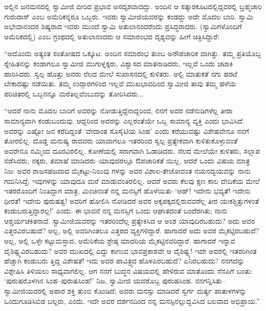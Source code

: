 ಅಲ್ಲಿನ ಜನಮನದಲ್ಲಿ ಸ್ವಾಮೀಜಿ ಬೀರಿದ ಪ್ರಭಾವ ಅಸದೃಶವಾದದ್ದು. ಅಂದಿನ ಆ ಸತ್ಕಾರಕೂಟದಲ್ಲಿದ್ದವರಲ್ಲಿ ಬ್ರಹ್ಮಚಾರಿ ಗುರುದಾಸ್ ಎಂಬ ಅಮೆರಿಕನ್ನರೂ ಒಬ್ಬರು. ಇವರು ಸ್ವಾಮೀಜಿಯವರನ್ನು ಕಂಡದ್ದು ಅದೇ ಮೊದಲ ಬಾರಿ. ಸ್ವಾಮಿ ಅಭೇದಾನಂದರ ಶಿಷ್ಯರಾದ ಇವರು ಮುಂದೆ ಸ್ವಾಮಿ ಅತುಲಾನಂದರೆಂದು ಪ್ರಸಿದ್ಧರಾದರು.  (ಸ್ವಾಮಿಗಳೊಂದಿಗೆ ಅಮೆರಿಕದಲ್ಲಿ) ಎಂಬ ಗ್ರಂಥದಲ್ಲಿ ಅತುಲಾನಂದರು ಆ ಸಮಾರಂಭದ ದೃಶ್ಯವನ್ನು ಹೀಗೆ ಚಿತ್ರಿಸಿದ್ದಾರೆ:

“ಅದೊಂದು ಅತ್ಯಂತ ಸಂತೋಷದ ಒಕ್ಕೂಟ. ಅಂದಿನ ಸಮಾರಂಭ ತುಂಬ ಅನೌಪಚಾರಿಕ ವಾಗಿತ್ತು. ತಮ್ಮ ಪ್ರತಿಯೊಬ್ಬ ಸ್ನೇಹಿತನನ್ನು ಕಂಡಾಗಲೂ ಸ್ವಾಮೀಜಿ ಮುಗುಳ್ನಕ್ಕರು, ವಿಶ್ವಾಸದ ಮಾತನಾಡಿದರು, ಇಲ್ಲವೆ ಒಂದು ಚಟಾಕಿ ಹಾರಿಸಿದರು. ಸ್ವಲ್ಪ ಹೊತ್ತು ಅವರು ನೆಲದ ಮೇಲೆ ಸುಖಾಸನದಲ್ಲಿ ಕುಳಿತರು. ಅಲ್ಲಿ ಮಾತುಕತೆ ನಗು ಹರಟೆ ಬೇಕಾದಷ್ಟು ನಡೆಯಿತು. ತಮ್ಮ ಉದ್ಗಾರಗಳಿಂದ ಇಲ್ಲವೆ ಮುಖಭಾವದಿಂದ ಸ್ವಾಮೀಜಿ ತಾವು ತಮ್ಮ ಹಳೆಯ ಪರಿಚಿತರಲ್ಲಿ ಒಬ್ಬನನ್ನೂ ಮರೆತಿಲ್ಲವೆಂಬುದನ್ನು ತೋರಿಸಿದರು... 

“ಆದರೆ ನಾನು ಮೊದಲ ಬಾರಿಗೆ ಅವರನ್ನು ನೋಡುತ್ತಿದ್ದೆನಾದ್ದರಿಂದ, ನನಗೆ ಅವರ ನಡೆನುಡಿಗಳೆಲ್ಲ ತೀರಾ ಸಾಮಾನ್ಯವಾಗಿ ಕಂಡುಬಂದುವು. ಆದ್ದರಿಂದ ಅವರನ್ನು ಎಲ್ಲರಂತೆಯೇ ಒಬ್ಬ ಸಾಮಾನ್ಯ ವ್ಯಕ್ತಿ ಎಂದು ಭಾವಿಸಿದೆ. ಅವರನ್ನು ಎಷ್ಟೋ ಜನ ಕರೆದಿದ್ದಂತೆ ‘ವೇದಾಂತ ಸೊಸೈಟಿಯ ಸಿಂಹ’ ಎಂದು ಕರೆಯುವಷ್ಟು ವಿಶೇಷವೇನೂ ನನಗೆ ತೋರಲಿಲ್ಲ. ದೊಡ್ಡ ಮನುಷ್ಯ ರಾದವರು ಯಾವಾಗಲೂ ಇತರರಿಂದ ಸ್ವಲ್ಪ ಪ್ರತ್ಯೇಕವಾಗಿ ಕುಳಿತುಕೊಳ್ಳುವಂತೆ ಅವರೇನೂ ನಮ್ಮಿಂದ ದೂರವಿರಲಿಲ್ಲ. ಕೋಣೆಯಲ್ಲಿ ಸರಾಗವಾಗಿ ಓಡಾಡಿದರು. ನೆಲದ ಮೇಲೆಯೇ ಕುಳಿತರು, ಸಲ್ಲಾಪ ನಡೆಸಿದರು, ನಕ್ಕರು, ತಮಾಷೆ ಮಾಡಿದರು–ಯಾವುದರಲ್ಲೂ ಔಪಚಾರಿಕತೆ ಯಿಲ್ಲ. ಆದರೆ ಒಂದು ವಿಷಯ ಮಾತ್ರ ನಿಜ: ಅವರ ರಾಜಸಹಜವಾದ ಮೈಕಟ್ಟು-ನಿಲುವು ಗಳನ್ನು ಅವರ ವಿಶಾಲ-ತೇಜೋವಂತ ನಯನದ್ವಯವನ್ನು ನಾನು ಗಮನಿಸಿದ್ದೆ; ಇವುಗಳನ್ನು ಯಾವುದೂ ಮರೆ ಮಾಡುವಂತಿರಲಿಲ್ಲ. ಆದರೆ ಅವರು ಕೆಲವು ಕ್ಷಣ ಕಾಲ ವೇದಿಕೆಯ ಮೇಲೆ ಇತರರೊಂದಿಗೆ ನಿಂತಿದ್ದಾಗ ಮಾತ್ರ, ಮಿಂಚಿನಂತೆ ನನ್ನ ಮನಸ್ಸಿಗೆ ಹೊಳೆಯಿತು–‘ಆಹ್! ಇದೇನು ಭವ್ಯತೆ! ಇದೇನು ಧೀರತೆ! ಇದೇನು ಪುರುಷತ್ವ! ಅವರಿಗೆ ಹೋಲಿಸಿ ನೋಡಿದರೆ ಅವರ ಅಕ್ಕಪಕ್ಕದಲ್ಲಿರುವವರೆಲ್ಲ ತೀರ ಯಃಕಶ್ಚಿತ್ತುಗಳಂತೆ ಕಂಡುಬರುತ್ತಿದ್ದಾರಲ್ಲ!’ ಎಂದು. ಈ ಭಾವನೆ ನನ್ನ ಮನಸ್ಸಿಗೆ ಒಂದು ಆಘಾತದಂತೆ ಬಂದೆರಗಿತು; ನಾನು ಆಶ್ಚರ್ಯಚಕಿತನಾದೆ. ಸ್ವಾಮೀಜಿಯವರನ್ನು ಇತರರಿಂದೆಲ್ಲ ಪ್ರತ್ಯೇಕಿಸಿದ ಆ ಅಂಶ ಯಾವುದಿರಬಹುದು? ಅದು ಅವರ ಎತ್ತರವಿರಬಹುದೆ? ಅಲ್ಲ, ಅಲ್ಲಿ ಅವರಿಗಿಂತಲೂ ಎತ್ತರದ ವ್ಯಕ್ತಿಗಳಿದ್ದಾರೆ. ಹಾಗಾದರೆ ಅದು ಅವರ ಮೈಕಟ್ಟಿರಬಹುದೆ? ಅಲ್ಲ, ಅಲ್ಲಿ ಒಳ್ಳೇ ಕಟ್ಟುಮಸ್ತಾದ, ಅಮೆರಿಕೆಯ ಶ್ರೇಷ್ಠ ಮಾದರಿಯ ಮೈಕಟ್ಟಿನವರಿದ್ದಾರೆ. ಹಾಗಾದರೆ ಇನ್ನಾವ ವೈಶಿಷ್ಟ್ಯವಿರಬಹುದು? ಅವರ ಮುಖದಲ್ಲಿ ಎದ್ದು ಕಾಣುವ ಭಾವಪ್ರಕಾಶವೇ ಆ ವೈಶಿಷ್ಟ್ಯ! ಇದೇ ಅವರಲ್ಲಿ ಇತರರಿಗಿಂತ ಹೆಚ್ಚಾಗಿ ಕಂಡುಬರು ತ್ತಿದ್ದ ವಿಶೇಷತೆ! ಇದು ಅವರ ಪಾವಿತ್ರ್ಯದ ಹೊಳಪಿರಬಹುದೆ? ಏನಿರಬಹುದು? ನನಗದನ್ನು ವಿಶ್ಲೇಷಿಸಿ ತಿಳಿಯಲು ಸಾಧ್ಯವಾಗಲಿಲ್ಲ. ಆಗ ನನಗೆ ಬುದ್ಧನ ವಿಷಯದಲ್ಲಿ ಹೇಳಿರುವ ಮಾತೊಂದು ನೆನಪಿಗೆ ಬಂತು: ‘ಪುರುಷರೊಳಗಿನ ಸಿಂಹ–ಪುರುಷಸಿಂಹ!’ ನಿಜ, ಸ್ವಾಮೀಜಿ ಯವರೊಬ್ಬ ಪುರುಷಸಿಂಹ. ನನಗನ್ನಿಸಿತು–ಸ್ವಾಮೀಜಿಯವರಲ್ಲಿ ಅಪಾರ ಶಕ್ತಿ ತುಂಬಿ ಕೊಂಡಿದೆ; ಅವರು ಮನಸ್ಸು ಮಾಡಿದರೆ ಸ್ವರ್ಗ ಮರ್ತ್ಯ ಪಾತಾಳಗಳನ್ನು ಒಂದುಗೂಡಿಸಿಬಿಡ ಬಲ್ಲರು, ಎಂದು. ಇದೇ ಅವರ ದರ್ಶನದಿಂದ ನನ್ನ ಮನಸ್ಸಿನಲ್ಲುದ್ಭವಿಸಿದ ಬಲವಾದ ಅಭಿಪ್ರಾಯ.”

